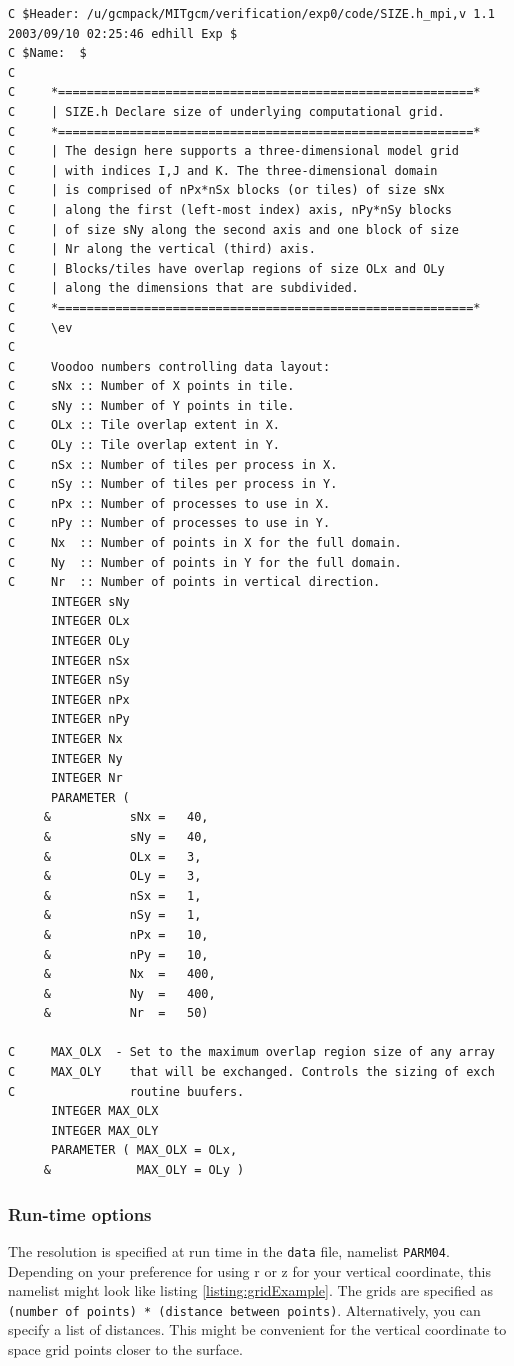 \documentclass[11pt]{article}
\begin{document}
\begin{lstlisting}[caption={Sample SIZE.h configuration file}, label={listing:SIZE.h}]
C $Header: /u/gcmpack/MITgcm/verification/exp0/code/SIZE.h_mpi,v 1.1 2003/09/10 02:25:46 edhill Exp $
C $Name:  $
C
C     *==========================================================*
C     | SIZE.h Declare size of underlying computational grid.
C     *==========================================================*
C     | The design here supports a three-dimensional model grid
C     | with indices I,J and K. The three-dimensional domain
C     | is comprised of nPx*nSx blocks (or tiles) of size sNx
C     | along the first (left-most index) axis, nPy*nSy blocks
C     | of size sNy along the second axis and one block of size
C     | Nr along the vertical (third) axis.
C     | Blocks/tiles have overlap regions of size OLx and OLy
C     | along the dimensions that are subdivided.
C     *==========================================================*
C     \ev
C
C     Voodoo numbers controlling data layout:
C     sNx :: Number of X points in tile.
C     sNy :: Number of Y points in tile.
C     OLx :: Tile overlap extent in X.
C     OLy :: Tile overlap extent in Y.
C     nSx :: Number of tiles per process in X.
C     nSy :: Number of tiles per process in Y.
C     nPx :: Number of processes to use in X.
C     nPy :: Number of processes to use in Y.
C     Nx  :: Number of points in X for the full domain.
C     Ny  :: Number of points in Y for the full domain.
C     Nr  :: Number of points in vertical direction.
      INTEGER sNy
      INTEGER OLx
      INTEGER OLy
      INTEGER nSx
      INTEGER nSy
      INTEGER nPx
      INTEGER nPy
      INTEGER Nx
      INTEGER Ny
      INTEGER Nr
      PARAMETER (
     &           sNx =   40,
     &           sNy =   40,
     &           OLx =   3,
     &           OLy =   3,
     &           nSx =   1,
     &           nSy =   1,
     &           nPx =   10,
     &           nPy =   10,
     &           Nx  =   400,
     &           Ny  =   400,
     &           Nr  =   50)

C     MAX_OLX  - Set to the maximum overlap region size of any array
C     MAX_OLY    that will be exchanged. Controls the sizing of exch
C                routine buufers.
      INTEGER MAX_OLX
      INTEGER MAX_OLY
      PARAMETER ( MAX_OLX = OLx,
     &            MAX_OLY = OLy )
\end{lstlisting}

\subsubsection*{Run-time options}
The resolution is specified at run time in the \verb|data| file, namelist \verb|PARM04|. Depending on your preference for using r or z for your vertical coordinate, this namelist might look like listing \ref{listing:gridExample}. The grids are specified as \verb| (number of points) * (distance between points)|. Alternatively, you can specify a list of distances. This might be convenient for the vertical coordinate to space grid points closer to the surface.
\end{document}
